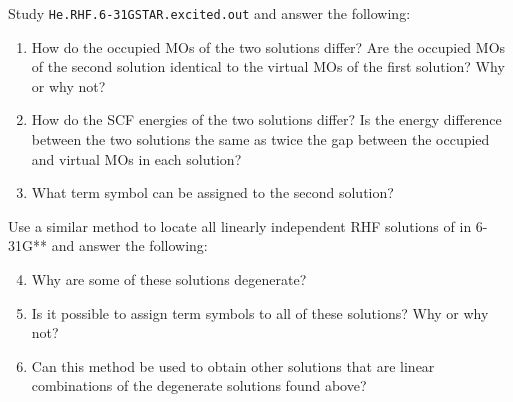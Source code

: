 				\begin{Task}
					Study \texttt{He.RHF.6-31GSTAR.excited.out} and answer the following:
						\begin{enumerate}[topsep=0pt,itemsep=-1ex,partopsep=1ex,parsep=1ex,label=(\alph*)]
							\item How do the occupied MOs of the two solutions differ? Are the occupied MOs of the second solution identical to the virtual MOs of the first solution? Why or why not?
							\item How do the SCF energies of the two solutions differ? Is the energy difference between the two solutions the same as twice the gap between the occupied and virtual MOs in each solution?
							\item What term symbol can be assigned to the second solution?
						\end{enumerate}
					Use a similar method to locate all linearly independent RHF solutions of  in 6-31G** and answer the following:
						\begin{enumerate}[topsep=0pt,itemsep=-1ex,partopsep=1ex,parsep=1ex,label=(\alph*)]
							\setcounter{enumi}{3}
							\item Why are some of these solutions degenerate?
							\item Is it possible to assign term symbols to all of these solutions? Why or why not?
							\item Can this method be used to obtain other solutions that are linear combinations of the degenerate solutions found above?
						\end{enumerate}
				\end{Task}